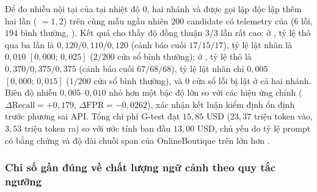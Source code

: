 Để đo nhiễu nội tại của  tại nhiệt độ $0$, hai nhánh  và  được gọi lặp độc lập thêm hai lần ( $= 1, 2$) trên cùng mẫu ngẫu nhiên $200$ candidate có telemetry của  ($6$ lỗi, $194$ bình thường, ). Kết quả cho thấy độ đồng thuận $3/3$ lần rất cao: ở , tỷ lệ  thô qua ba lần là $0{,}120 / 0{,}110 / 0{,}120$ (cảnh báo cuối $17/15/17$), tỷ lệ lật nhãn là $0{,}010$ $[0{,}000;\, 0{,}025]$ ($2/200$ cửa sổ bình thường); ở , tỷ lệ thô là $0{,}370 / 0{,}375 / 0{,}375$ (cảnh báo cuối $67/68/68$), tỷ lệ lật nhãn chỉ $0{,}005$ $[0{,}000;\, 0{,}015]$ ($1/200$ cửa sổ bình thường), và $0$ cửa sổ lỗi bị lật ở cả hai nhánh. Biên độ nhiễu $0{,}005$--$0{,}010$ nhỏ hơn một bậc độ lớn so với các hiệu ứng chính ($\Delta\text{Recall} = +0{,}179$, $\Delta\text{FPR} = -0{,}0262$), xác nhận kết luận kiểm định ổn định trước phương sai API. Tổng chi phí G-test đạt $15{,}85$ USD ($23{,}37$ triệu token vào, $3{,}53$ triệu token ra) so với ước tính ban đầu $13{,}00$ USD, chủ yếu do tỷ lệ prompt có bằng chứng và độ dài chuỗi span của OnlineBoutique trên  lớn hơn .

\subsubsection{Chỉ số gần đúng về chất lượng ngữ cảnh theo quy tắc ngưỡng}
\label{sec:ch5-context-precision}

